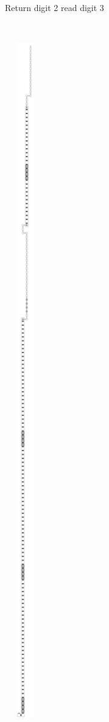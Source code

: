 \begin{figure}[H]
\begin{subfigure}[t]{0.2\textwidth}
                \caption{\label{fig:return_paths/return_digit2_read_digit3_general} Return digit 2 read digit 3}
            \end{subfigure}%
            ~
            \begin{subfigure}[t]{0.2\textwidth}
                \centering
                \includegraphics[width=0.2\textwidth]{return_paths/return_digit3_read_digit1_general}

\end{subfigure}
\end{figure}
